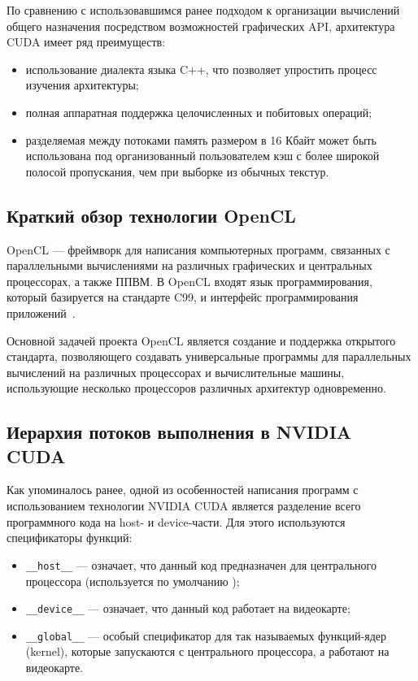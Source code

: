 По сравнению с использовавшимся ранее подходом к организации вычислений общего назначения посредством возможностей графических API, архитектура CUDA имеет ряд преимуществ:
\begin{itemize}
\item использование диалекта языка C++, что позволяет упростить процесс изучения архитектуры;
\item  полная аппаратная поддержка целочисленных и побитовых операций;
\item  разделяемая между потоками память размером в 16 Кбайт может быть
использована под организованный пользователем кэш с более широкой полосой пропускания, чем при выборке из обычных текстур.
\end{itemize}

\subsection{Краткий обзор технологии OpenCL}

OpenCL --- фреймворк для написания компьютерных программ, связанных
с параллельными вычислениями на различных графических и центральных
процессорах, а также ППВМ. В OpenCL входят язык программирования, который базируется на стандарте C99, и интерфейс программирования приложений~\cite{ruwiki:OpenCL}.

Основной задачей проекта OpenCL является создание и поддержка открытого стандарта, позволяющего создавать универсальные программы для параллельных вычислений на различных процессорах и вычислительные машины,
использующие несколько процессоров различных архитектур одновременно.

\subsection{Иерархия потоков выполнения в NVIDIA CUDA}

Как упоминалось ранее, одной из особенностей написания программ с использованием технологии NVIDIA CUDA является разделение всего программного кода
на host- и device-части. Для этого используются спецификаторы функций:
\begin{itemize}
\item \texttt{\_\_host\_\_} --- означает, что данный код предназначен для центрального процессора (используется по умолчанию );
\item \texttt{\_\_device\_\_} --- означает, что данный код работает на видеокарте;
\item \texttt{\_\_global\_\_} --- особый спецификатор для так называемых функций-ядер (kernel), которые запускаются с центрального процессора, а работают на видеокарте.
\end{itemize}

